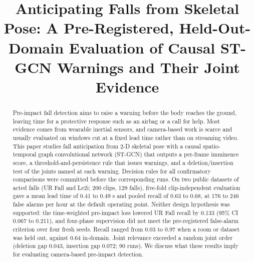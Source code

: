 \documentclass[journal]{IEEEtran}
\begin{document}
\title{Anticipating Falls from Skeletal Pose: A Pre-Registered, Held-Out-Domain Evaluation of Causal ST-GCN Warnings and Their Joint Evidence}

\author{\and{}}

\maketitle

\begin{abstract}
Pre-impact fall detection aims to raise a warning before the body reaches the ground, leaving time for a protective response such as an airbag or a call for help. Most evidence comes from wearable inertial sensors, and camera-based work is scarce and usually evaluated on windows cut at a fixed lead time rather than on streaming video. This paper studies fall anticipation from 2-D skeletal pose with a causal spatio-temporal graph convolutional network (ST-GCN) that outputs a per-frame imminence score, a threshold-and-persistence rule that issues warnings, and a deletion/insertion test of the joints named at each warning. Decision rules for all confirmatory comparisons were committed before the corresponding runs. On two public datasets of acted falls (UR Fall and Le2i; 200 clips, 129 falls), five-fold clip-independent evaluation gave a mean lead time of 0.41 to 0.49 s and pooled recall of 0.63 to 0.68, at 176 to 246 false alarms per hour at the default operating point. Neither design hypothesis was supported: the time-weighted pre-impact loss lowered UR Fall recall by 0.133 (95\% CI 0.067 to 0.211), and four-phase supervision did not meet the pre-registered false-alarm criterion over four fresh seeds. Recall ranged from 0.03 to 0.97 when a room or dataset was held out, against 0.64 in-domain. Joint relevance exceeded a random joint order (deletion gap 0.043, insertion gap 0.072; 90 runs). We discuss what these results imply for evaluating camera-based pre-impact detection.
\end{abstract}
\end{document}
